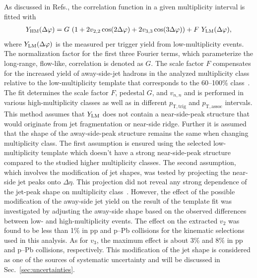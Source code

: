 As discussed in Refs.\cite{ATLAS:2015hzw,ATLAS:2016yzd}, the correlation function in a given multiplicity interval is fitted with 
\begin{eqnarray}
\label{eq:narray}
Y_{\rm{HM}}(\Delta\varphi) = G~(1 + 2v_{2,2}\cos(2\Delta\varphi) + 2v_{3,3}\cos(3\Delta\varphi)) + F~Y_{\rm{LM}}(\Delta\varphi),
\label{eq:tmpfit}
\end{eqnarray}
where $Y_{\rm{LM}}(\Delta\varphi)$ is the measured per trigger yield from low-multiplicity events. The normalization factor for the first three Fourier terms, which parameterize the long-range, flow-like, correlation is denoted as $G$. The scale factor $F$ compensates for the increased yield of away-side-jet hadrons in the analyzed multiplicity class relative to the low-multiplicity template that corresponds to the 60--100\% class~\cite{ALICE:2013tla,ALICE:2014mas}.
The fit determines the scale factor $F$, pedestal $G$, and $v_{n,n}$ and is performed in various high-multiplicity classes as well as in different $p_\mathrm{T,trig}$ and $p_\mathrm{T,assoc}$ intervals. 
This method assumes that $Y_{\rm{LM}}$ does not contain a near-side-peak structure that would originate from jet fragmentation or near-side ridge.
Further it is assumed that the shape of the away-side-peak structure remains the same when changing multiplicity class.
The first assumption is ensured using the selected low-multiplicity template which doesn't have a strong near-side-peak structure compared to the studied higher multiplicity classes. The second assumption, which involves the modification of jet shapes, was tested by projecting the near-side jet peaks onto $\Delta\eta$. This projection did not reveal any strong dependence of the jet-peak shape on multiplicity class~\cite{LAKOMOV2017329}. However, the effect of the possible modification of the away-side jet yield on the result of the template fit was investigated by adjusting the away-side shape based on the observed differences between low- and high-multiplicity events. The effect on the extracted $v_2$ was found to be less than 1$\%$ in pp and p--Pb collisions for the kinematic selections used in this analysis. As for $v_3$, the maximum effect is about 3\% and 8$\%$ in pp and p--Pb collisions, respectively.  This modification of the jet shape is considered as one of the sources of systematic uncertainty and will be discussed in Sec.~\ref{sec:uncertainties}.

